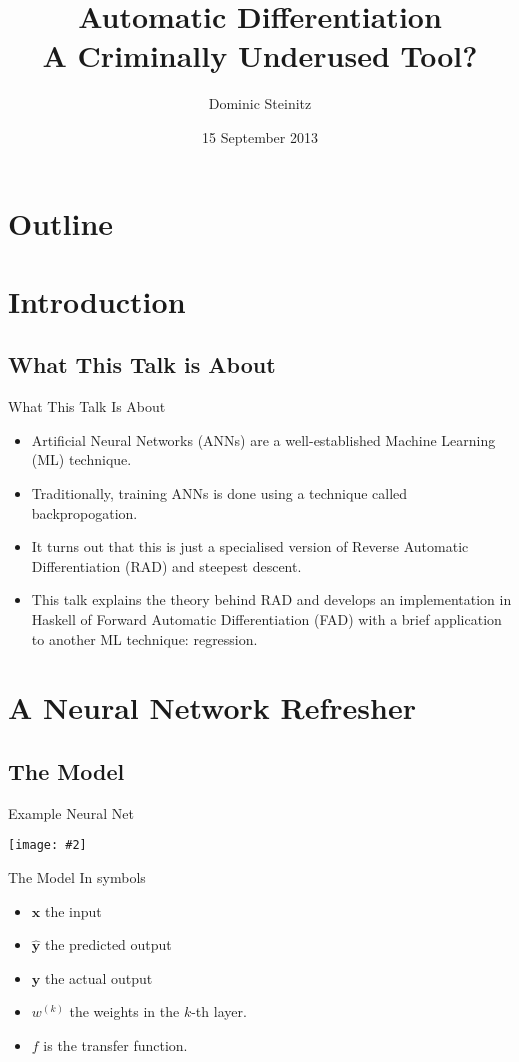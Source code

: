 \documentclass{beamer}
\title[Automatic differentiation]{Automatic Differentiation\\A Criminally Underused Tool?}
\author{Dominic Steinitz}
\institute{Kingston University}
\date{15 September 2013}
\newcommand {\framedgraphic}[2] {
    \begin{frame}{#1}
        \begin{center}
            \texttt{[image: \#2]}
        \end{center}
    \end{frame}
}
\begin{document}
\begin{frame}
\titlepage
\end{frame}

\section*{Outline}
    \frame{\tableofcontents}

\section{Introduction}

\subsection{What This Talk is About}

\begin{frame}{What This Talk Is About}

  \begin{itemize}
  \item Artificial Neural Networks (ANNs) are a well-established
    Machine Learning (ML) technique.
  \item Traditionally, training ANNs is done using a technique called
    backpropogation.
  \item It turns out that this is just a specialised version of
    Reverse Automatic Differentiation (RAD) and steepest descent.
  \item This talk explains the theory behind RAD and develops an
    implementation in Haskell of Forward Automatic Differentiation
    (FAD) with a brief application to another ML technique:
    regression.
  \end{itemize}

\end{frame}

\section{A Neural Network Refresher}

\subsection{The Model}


\framedgraphic{Example Neural Net}{diagrams/ca75393cd25ce951edcd7133da24a2c6.png}

\begin{frame}[fragile]{The Model}
In symbols
\begin{itemize}
\item $\boldsymbol{x}$ the input
\item $\hat{\boldsymbol{y}}$ the predicted output
\item $\boldsymbol{y}$ the actual output
\item $w^{(k)}$ the weights in the $k$-th layer.
\item $f$ is the transfer function.
\end{itemize}
\end{frame}
\end{document}
